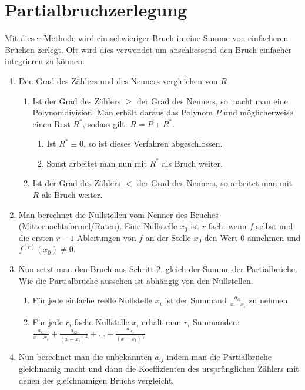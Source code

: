 \section{Partialbruchzerlegung}
Mit dieser Methode wird ein schwieriger Bruch in eine Summe von einfacheren
Brüchen zerlegt. Oft wird dies verwendet um anschliessend den Bruch einfacher integrieren zu können.

\begin{enumerate}
	\item Den Grad des Zählers und des Nenners vergleichen von $R$
	\begin{enumerate}
		\item Ist der Grad des Zählers $\geq$ der Grad des Nenners, so macht man eine 
		Polynomdivision. Man erhält daraus das Polynom $P$ und möglicherweise einen 
		Rest $R^*$, sodass gilt: $R = P + R^*$.
		\begin{enumerate}
			\item Ist $R^* \equiv 0$, so ist dieses Verfahren abgeschlossen.
			\item Sonst arbeitet man nun mit $R^*$ als Bruch weiter.
		\end{enumerate}
		\item Ist der Grad des Zählers $<$ der Grad des Nenners, so arbeitet man mit $R$ als Bruch weiter.
	\end{enumerate}
	\item Man berechnet die Nullstellen vom Nenner des Bruches (Mitternachtsformel/Raten). 
	Eine Nullstelle $x_0$ ist $r$-fach, wenn $f$ selbst und die ersten $r-1$ Ableitungen von $f$ an der Stelle $x_0$ den Wert $0$ annehmen und $f^{(r)}(x_0) \neq 0$.
	\item Nun setzt man den Bruch aus Schritt 2. gleich der Summe der
	Partialbrüche. Wie die Partialbrüche aussehen ist abhängig von den Nullstellen.  
	\begin{enumerate}
		\item Für jede einfache reelle Nullstelle $x_i$ ist der Summand
		$\frac{a_{i1}}{x-x_i}$ zu nehmen
		\item Für jede $r_i$-fache Nullstelle $x_i$ erhält man $r_i$ Summanden:
		$\frac{a_{i1}}{x-x_i} + \frac{a_{i2}}{(x-x_i)^2} + \ldots +
		\frac{a_{ir_i}}{(x-x_i)^{r_i}}$
	\end{enumerate}
	\item Nun berechnet man die unbekannten $a_{ij}$ indem man die Partialbrüche
	gleichnamig macht und dann die Koeffizienten des ursprünglichen Zählers mit
	denen des gleichnamigen Bruchs vergleicht.
\end{enumerate}

